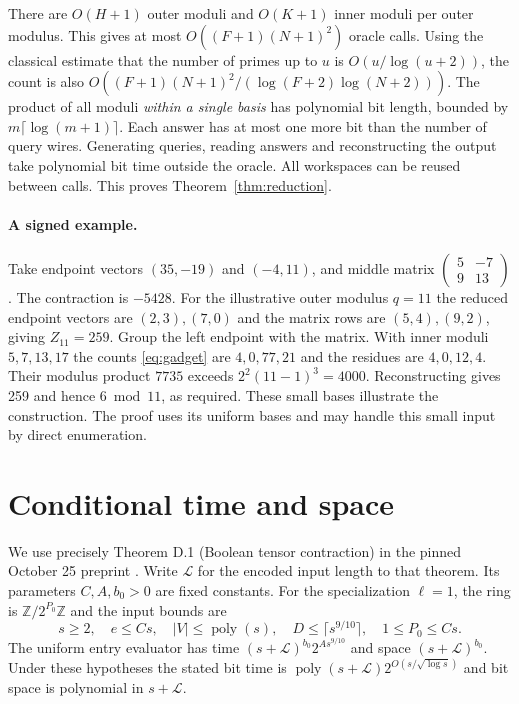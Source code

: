 \documentclass[11pt]{article}
\newcommand{\Z}{\mathbb Z}
\newcommand{\poly}{\operatorname{poly}}
\begin{document}
There are $O(H+1)$ outer moduli and $O(K+1)$ inner moduli per outer modulus. This gives at most $O((F+1)(N+1)^2)$ oracle calls. Using the classical estimate that the number of primes up to $u$ is $O(u/\log(u+2))$, the count is also $O((F+1)(N+1)^2/(\log(F+2)\log(N+2)))$. The product of all moduli \emph{within a single basis} has polynomial bit length, bounded by $m\lceil\log(m+1)\rceil$. Each answer has at most one more bit than the number of query wires. Generating queries, reading answers and reconstructing the output take polynomial bit time outside the oracle. All workspaces can be reused between calls. This proves Theorem~\ref{thm:reduction}.

\paragraph{A signed example.}
Take endpoint vectors $(35,-19)$ and $(-4,11)$, and middle matrix
$\left(\begin{smallmatrix}5&-7\\9&13\end{smallmatrix}\right)$.
The contraction is $-5428$. For the illustrative outer modulus $q=11$ the reduced endpoint vectors are $(2,3),(7,0)$ and the matrix rows are $(5,4),(9,2)$, giving $Z_{11}=259$. Group the left endpoint with the matrix. With inner moduli $5,7,13,17$ the counts \eqref{eq:gadget} are $4,0,77,21$ and the residues are $4,0,12,4$. Their modulus product $7735$ exceeds $2^2(11-1)^3=4000$. Reconstructing gives 259 and hence $6\bmod 11$, as required. These small bases illustrate the construction. The proof uses its uniform bases and may handle this small input by direct enumeration.

\section{Conditional time and space}
We use precisely Theorem D.1 (Boolean tensor contraction) in the pinned October 25 preprint \cite{oai}. Write $\mathcal L$ for the encoded input length to that theorem. Its parameters $C,A,b_0>0$ are fixed constants. For the specialization $\ell=1$, the ring is $\Z/2^{P_0}\Z$ and the input bounds are
\[
 s\ge2,\quad e\le Cs,\quad |V|\le\poly(s),\quad
 D\le\lceil s^{9/10}\rceil,\quad 1\le P_0\le Cs.
\]
The uniform entry evaluator has time $(s+\mathcal L)^{b_0}2^{As^{9/10}}$ and space $(s+\mathcal L)^{b_0}$. Under these hypotheses the stated bit time is $\poly(s+\mathcal L)2^{O(s/\sqrt{\log s})}$ and bit space is polynomial in $s+\mathcal L$.
\end{document}
